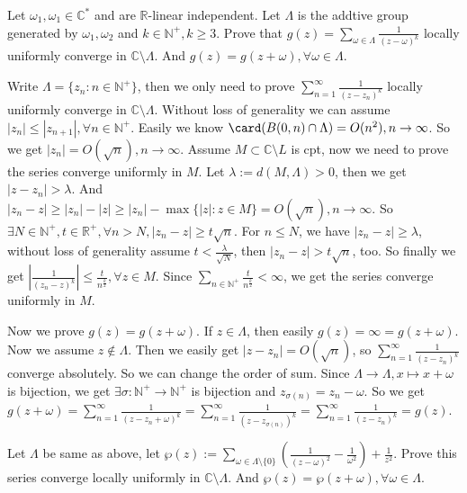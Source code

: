 \documentclass{ctexart}
\begin{document}
\begin{problem}
Let \(\omega_1,\omega_1 \in \mathbb{C}^*\) and are \(\mathbb{R}\)-linear independent.
Let \(\Lambda\) is the addtive group generated by \(\omega_1,\omega_2\) and \(k \in \mathbb{N}^+,k \geq 3 \).
Prove that \(g(z)=\sum_{\omega \in \Lambda} \frac{1}{(z-\omega)^k}\) locally uniformly converge in \(\mathbb{C} \setminus \Lambda\).
And \(g(z)=g(z+\omega),\forall \omega \in \Lambda\).
\end{problem}

\begin{solution}
	Write \(\Lambda=\{z_n:n \in \mathbb{N}^+\}\), then we only need to prove \(\sum_{n=1}^{\infty} \frac{1}{(z-z_n)^k}\) locally uniformly converge in \(\mathbb{C} \setminus \Lambda\).
	Without loss of generality we can assume \(|z_n| \leq |z_{n+1}|,\forall n \in \mathbb{N}^+\).
	Easily we know \(\card(B(0,n)\cap \Lambda)=O(n^2),n \to \infty\).
	So we get \(|z_n|=O(\sqrt{n}),n \to \infty\).
	Assume \(M \subset \mathbb{C}\setminus L\) is cpt, now we need to prove the series converge uniformly in \(M\).
	Let \(\lambda:=d(M,\Lambda)>0\), then we get \(|z-z_n|>\lambda\).
	And \(|z_n-z| \geq |z_n|-|z| \geq |z_n|-\max\{|z|:z \in M\}=O(\sqrt{n}),n \to \infty\).
	So \(\exists N \in \mathbb{N}^+,t \in \mathbb{R}^+,\forall n>N,|z_n-z| \geq t \sqrt{n}\).
	For \(n \leq N\), we have \(|z_n-z| \geq \lambda\), without loss of generality assume \(t<\frac{\lambda}{\sqrt{N}}\), then \(|z_n-z| >t \sqrt{n}\), too.
	So finally we get \(\left|\frac{1}{(z_n-z)^k}\right| \leq \frac{t}{n^{ \frac{k}{2}}}, \forall z \in M\).
	Since \(\sum_{n \in \mathbb{N}^+} \frac{t}{n^{ \frac{k}{2}}}<\infty\), we get the series converge uniformly in \(M\).

	Now we prove \(g(z)=g(z+\omega)\). If \(z \in \Lambda\), then easily \(g(z)=\infty=g(z+\omega)\).
	Now we assume \(z \notin \Lambda\). Then we easily get \(|z-z_n|=O(\sqrt{n})\), so \(\sum_{n=1}^{\infty} \frac{1}{(z-z_n)^k}\) converge absolutely.
	So we can change the order of sum. Since \(\Lambda \to \Lambda,x \mapsto x+\omega\) is bijection, we get \(\exists \sigma:\mathbb{N}^+ \to \mathbb{N}^+\) is bijection
	and \(z_{\sigma(n)}=z_n-\omega\).
	So we get \(g(z+\omega)=\sum_{n=1}^{\infty} \frac{1}{(z-z_n+\omega)^k}=\sum_{n=1}^{\infty} \frac{1}{(z-z_{\sigma(n)})^k}=\sum_{n=1}^{\infty} \frac{1}{(z-z_n)^k}=g(z)\).
\end{solution}

\begin{problem}
Let \(\Lambda\) be same as above, let \(\wp(z):=\sum_{\omega \in \Lambda \setminus \{0\}} \left(\frac{1}{(z-\omega)^2} -\frac{1}{\omega^2}\right)+\frac{1}{z^2}\).
Prove this series converge locally uniformly in \(\mathbb{C} \setminus \Lambda\).
And \(\wp(z)=\wp(z+\omega),\forall \omega \in \Lambda\).
\end{problem}
\end{document}
